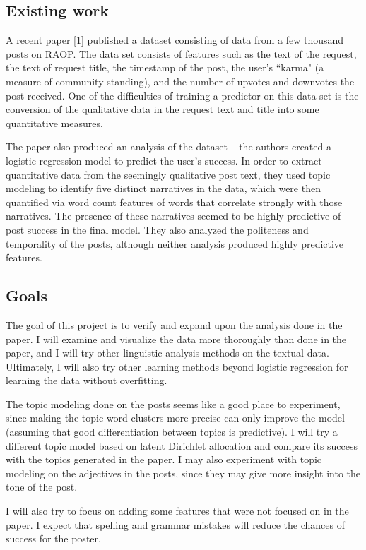 \documentclass{article}\usepackage[]{graphicx}\usepackage[]{color}
\begin{document}
\subsection{Existing work}

A recent paper [1] published a dataset consisting of data from a few thousand posts on RAOP. The data set consists of features such as the text of the request, the text of request title, the timestamp of the post, the user's ``karma" (a measure of community standing), and the number of upvotes and downvotes the post received. One of the difficulties of training a predictor on this data set is the conversion of the qualitative data in the request text and title into some quantitative measures.

The paper also produced an analysis of the dataset -- the authors created a logistic regression model to predict the user's success. In order to extract quantitative data from the seemingly qualitative post text, they used topic modeling to identify five distinct narratives in the data, which were then quantified via word count features of words that correlate strongly with those narratives. The presence of these narratives seemed to be highly predictive of post success in the final model. They also analyzed the politeness and temporality of the posts, although neither analysis produced highly predictive features.

\subsection{Goals}

The goal of this project is to verify and expand upon the analysis done in the paper. I will examine and visualize the data more thoroughly than done in the paper, and I will try other linguistic analysis methods on the textual data. Ultimately, I will also try other learning methods beyond logistic regression for learning the data without overfitting.

The topic modeling done on the posts seems like a good place to experiment, since making the topic word clusters more precise can only improve the model (assuming that good differentiation between topics is predictive). I will try a different topic model based on latent Dirichlet allocation and compare its success with the topics generated in the paper. I may also experiment with topic modeling on the adjectives in the posts, since they may give more insight into the tone of the post.

I will also try to focus on adding some features that were not focused on in the paper. I expect that spelling and grammar mistakes will reduce the chances of success for the poster.
\end{document}
